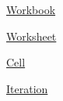 
\begin{DoxyItemize}
\item \mbox{\hyperlink{_workbook_8md}{Workbook}}
\item \mbox{\hyperlink{_worksheet_8md}{Worksheet}}
\item \mbox{\hyperlink{basics_2cell_8md}{Cell}}
\item \mbox{\hyperlink{_iteration_8md}{Iteration}} 
\end{DoxyItemize}